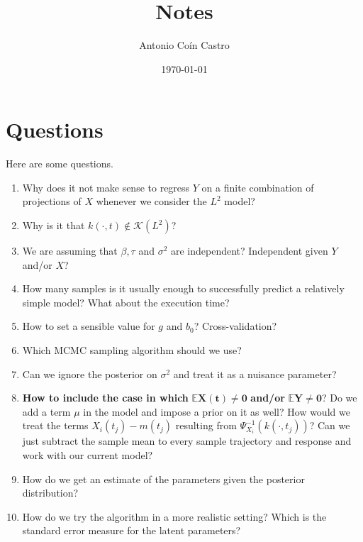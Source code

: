 \documentclass[
  a4paper,
	fontsize=11pt, %
	twoside=false, %
  secnumdepth=2,
	numbers=noenddot, %
]{kaohandt}
\newcommand{\bm}{\symbf}
\begin{document}
\title{Notes}
\author[FM]{Antonio Coín Castro}
\date{\today}
\maketitle

\margintoc[*-2]

\section{Questions}

Here are some questions.

\begin{enumerate}

  \item Why does it not make sense to regress \(Y\) on a finite combination of projections of \(X\) whenever we consider the \(L^2\) model?

  \item Why is it that \(k(\cdot, t) \notin \mathcal K(L^2)\)?

  \item We are assuming that \(\beta, \tau\) and \(\sigma^2\) are independent? Independent given \(Y\) and/or \(X\)?

  \item How many samples is it usually enough to successfully predict a relatively simple model? What about the execution time?

  \item How to set a sensible value for \(g\) and \(b_0\)? Cross-validation?

  \item Which MCMC sampling algorithm should we use?

  \item Can we ignore the posterior on \(\sigma^2\) and treat it as a nuisance parameter?

  \item \textbf{How to include the case in which} \(\bm{\mathds EX(t)\neq 0}\) \textbf{and/or} \(\bm{\mathds EY\neq 0}\)? Do we add a term \(\mu\) in the model and impose a prior on it as well? How would we treat the terms \(X_i(t_j) - m(t_j)\) resulting from \(\Psi^{-1}_{X_i}(k(\cdot, t_j))\)? Can we just subtract the sample mean to every sample trajectory and response and work with our current model?

  \item How do we get an estimate of the parameters given the posterior distribution?

  \item How do we try the algorithm in a more realistic setting? Which is the standard error measure for the latent parameters?

\end{enumerate}
\end{document}
